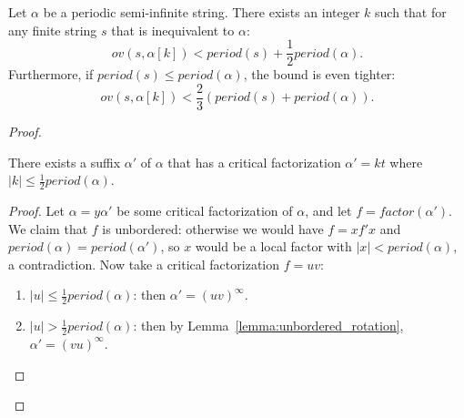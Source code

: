 \begin{lemma} \label{lemma:overlap_rotation}
Let $\alpha$ be a periodic semi-infinite string. There exists an integer $k$
such that for any finite string $s$ that is inequivalent to $\alpha$:
\begin{equation}
ov(s, \alpha[k]) < \textit{period}(s) + \frac{1}{2}\textit{period}(\alpha).
\end{equation}
Furthermore, if $\textit{period}(s) \le \textit{period}(\alpha)$, the bound is
even tighter:
\begin{equation}
ov(s, \alpha[k]) < \frac{2}{3} (\textit{period}(s) + \textit{period}(\alpha)).
\end{equation}
\end{lemma}
\begin{proof}
\noindent
\begin{claim} \label{claim:critical_suffix}
There exists a suffix $\alpha'$ of $\alpha$ that has a critical factorization
$\alpha' = kt$ where $|k| \leq \frac{1}{2}\textit{period}(\alpha)$.
\end{claim}
\begin{proof}
Let $\alpha = y\alpha'$ be some critical factorization of $\alpha$, and let $f =
\textit{factor}(\alpha')$. We claim that $f$ is unbordered: otherwise we would
have $f = xf'x$ and $\textit{period}(\alpha) = \textit{period}(\alpha')$, so $x$
would be a local factor with $|x| < \textit{period}(\alpha)$, a contradiction.
Now take a critical factorization $f = uv$:
\begin{enumerate}[label=(\arabic*), leftmargin=*]
\item $|u| \leq \frac{1}{2}\textit{period}(\alpha)$: then $\alpha' =
(uv)^\infty$.
\item $|u| > \frac{1}{2}\textit{period}(\alpha)$: then by
Lemma~\ref{lemma:unbordered_rotation}, $\alpha' = (vu)^\infty$.
\end{enumerate}
\end{proof}


\end{proof}
